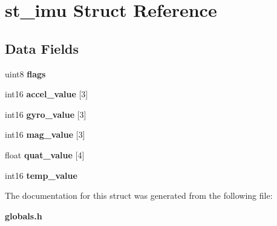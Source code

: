 \section{st\+\_\+imu Struct Reference}
\label{structst__imu}
\subsection*{Data Fields}
\begin{DoxyCompactItemize}
\item 
\mbox{\label{structst__imu_acd8859336a5cb8a70051c97a438726a1}} 
uint8 {\bfseries flags}
\item 
\mbox{\label{structst__imu_a76e9575b13f4c390ccec733a5dac028f}} 
int16 {\bfseries accel\+\_\+value} [3]
\item 
\mbox{\label{structst__imu_a515e671f6e4fe912e9af6c73a8d654b9}} 
int16 {\bfseries gyro\+\_\+value} [3]
\item 
\mbox{\label{structst__imu_ae78e11a5f5ad413f738f6eb69ac60277}} 
int16 {\bfseries mag\+\_\+value} [3]
\item 
\mbox{\label{structst__imu_a2825af9e90a3b4d11e0f99f34a73d555}} 
float {\bfseries quat\+\_\+value} [4]
\item 
\mbox{\label{structst__imu_a093731ce8df43a5beb8df6e78368ec4c}} 
int16 {\bfseries temp\+\_\+value}
\end{DoxyCompactItemize}


The documentation for this struct was generated from the following file\+:\begin{DoxyCompactItemize}
\item 
\textbf{ globals.\+h}\end{DoxyCompactItemize}
